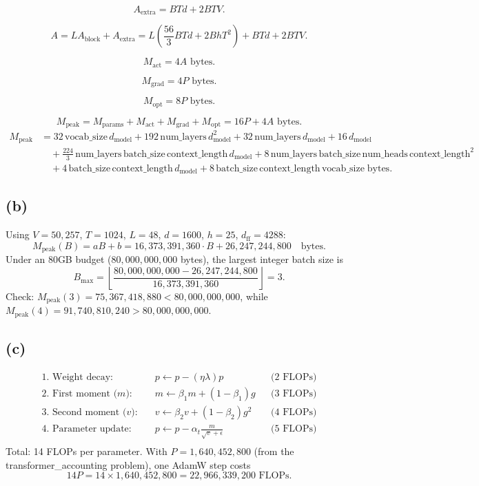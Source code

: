 \documentclass[11pt]{article}
\begin{document}
\[
A_{\text{extra}} = BTd + 2BTV.
\]

\[
A = L A_{\text{block}} + A_{\text{extra}}
= L\!\left(\frac{56}{3}BTd + 2BhT^2\right) + BTd + 2BTV .
\]

\[
M_{\text{act}} = 4A \text{ bytes}.
\]


\[
M_{\text{grad}} = 4P \text{ bytes}.
\]


\[
M_{\text{opt}} = 8P \text{ bytes}.
\]


\[
M_{\text{peak}} = M_{\text{params}} + M_{\text{act}} + M_{\text{grad}} + M_{\text{opt}}
= 16P + 4A \text{ bytes}.
\]
\begin{align*}
M_{\text{peak}}
&= 32\,\text{vocab\_size}\,d_{\text{model}}
+ 192\,\text{num\_layers}\,d_{\text{model}}^2
+ 32\,\text{num\_layers}\,d_{\text{model}}
+ 16\,d_{\text{model}} \\
&\quad + \frac{224}{3}\,\text{num\_layers}\,\text{batch\_size}\,\text{context\_length}\,d_{\text{model}}
+ 8\,\text{num\_layers}\,\text{batch\_size}\,\text{num\_heads}\,\text{context\_length}^2 \\
&\quad + 4\,\text{batch\_size}\,\text{context\_length}\,d_{\text{model}}
+ 8\,\text{batch\_size}\,\text{context\_length}\,\text{vocab\_size}
\;\text{bytes}.
\end{align*}

\subsection*{(b)}
Using \(V=50{,}257\), \(T=1024\), \(L=48\), \(d=1600\), \(h=25\), \(d_{\text{ff}}=4288\):
\[
M_{\text{peak}}(B)=aB+b
=16{,}373{,}391{,}360\cdot B + 26{,}247{,}244{,}800
\quad\text{bytes}.
\]
Under an 80GB budget (\(80{,}000{,}000{,}000\) bytes), the largest integer batch size is
\[
B_{\max}=\left\lfloor\frac{80{,}000{,}000{,}000-26{,}247{,}244{,}800}{16{,}373{,}391{,}360}\right\rfloor=3.
\]
Check: \(M_{\text{peak}}(3)=75{,}367{,}418{,}880<80{,}000{,}000{,}000\), while \(M_{\text{peak}}(4)=91{,}740{,}810{,}240>80{,}000{,}000{,}000\).

\subsection*{(c)}
\begin{align*}
    \text{1. Weight decay:} \quad & p \gets p - (\eta \lambda) p && \text{(2 FLOPs)} \\
    \text{2. First moment ($m$):} \quad & m \gets \beta_1 m + (1 - \beta_1) g && \text{(3 FLOPs)} \\
    \text{3. Second moment ($v$):} \quad & v \gets \beta_2 v + (1 - \beta_2) g^2 && \text{(4 FLOPs)} \\
    \text{4. Parameter update:} \quad & p \gets p - \alpha_t \frac{m}{\sqrt{v} + \epsilon} && \text{(5 FLOPs)} \\
\end{align*}
Total: 14 FLOPs per parameter. With \(P=1{,}640{,}452{,}800\) (from the transformer\_accounting problem), one AdamW step costs
\[
14P = 14 \times 1{,}640{,}452{,}800 = 22{,}966{,}339{,}200 \text{ FLOPs}.
\]
\end{document}

